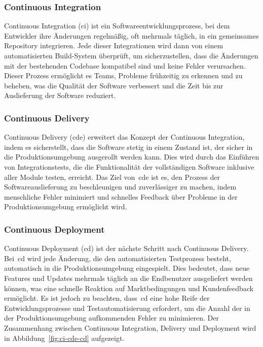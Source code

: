 \subsubsection{Continuous Integration}

Continuous Integration (\acrshort{ci}) ist ein Softwareentwicklungsprozess, bei dem Entwickler ihre Änderungen
regelmäßig, oft mehrmals täglich, in ein gemeinsames Repository integrieren.
Jede dieser Integrationen wird dann von einem automatisierten Build-System überprüft, um sicherzustellen, dass die
Änderungen mit der bestehenden Codebase kompatibel sind und keine Fehler verursachen.
Dieser Prozess ermöglicht es Teams, Probleme frühzeitig zu erkennen und zu beheben, was die Qualität der Software
verbessert und die Zeit bis zur Auslieferung der Software reduziert.

\subsubsection{Continuous Delivery}

Continuous Delivery (\acrshort{cde}) erweitert das Konzept der Continuous Integration, indem es sicherstellt, dass die
Software stetig in einem Zustand ist, der sicher in die Produktionsumgebung ausgerollt werden kann.
Dies wird durch das Einführen von Integrationstests, die die Funktionalität der vollständigen Software inklusive aller
Module testen, erreicht.
Das Ziel von\ \acrshort{cde} ist es, den Prozess der Softwareauslieferung zu beschleunigen und zuverlässiger zu machen,
indem menschliche Fehler minimiert und schnelles Feedback über Probleme in der Produktionsumgebung ermöglicht wird.

\subsubsection{Continuous Deployment}

Continuous Deployment (\acrshort{cd}) ist der nächste Schritt nach Continuous Delivery.
Bei\ \acrshort{cd} wird jede Änderung, die den automatisierten Testprozess besteht, automatisch in die
Produktionsumgebung eingespielt.
Dies bedeutet, dass neue Features und Updates mehrmals täglich an die Endbenutzer ausgeliefert werden können, was eine
schnelle Reaktion auf Marktbedingungen und Kundenfeedback ermöglicht.
Es ist jedoch zu beachten, dass\ \acrshort{cd} eine hohe Reife der Entwicklungsprozesse und Testautomatisierung
erfordert, um die Anzahl der in der Produktionsumgebung aufkommenden Fehler zu minimieren.
Der Zusammenhang zwischen Continuous Integration, Delivery und Deployment wird in Abbildung\ \ref{fig:ci-cde-cd}
aufgezeigt.

